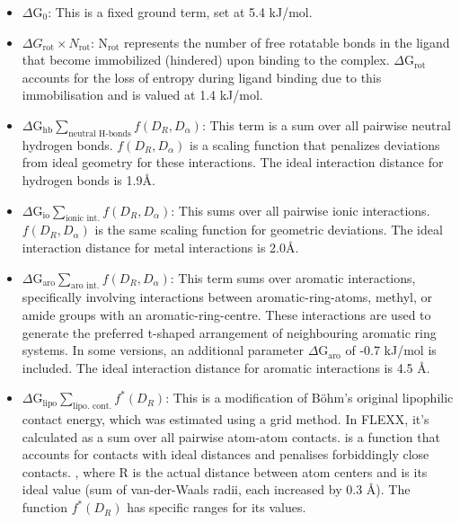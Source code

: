 \documentclass[11pt]{article}
\begin{document}
\begin{itemize}
\item \textbf{$\Delta\text{G}_0$}: This is a fixed ground term, set at 5.4 kJ/mol.

\item \textbf{$\Delta G_{\text{rot}} \times N_{\text{rot}}$}: $\text{N}_{\text{rot}}$ represents the number of free rotatable bonds in the ligand that become immobilized (hindered) upon binding to the complex. $\Delta \text{G}_{\text{rot}}$ accounts for the loss of entropy during ligand binding due to this immobilisation and is valued at 1.4 kJ/mol.

\item \textbf{$\Delta \text{G}_{\text{hb}} \sum_{\text{neutral H-bonds}} f(D_R, D_\alpha)$}: This term is a sum over all pairwise neutral hydrogen bonds. $f(D_R, D_\alpha)$ is a scaling function that penalizes deviations from ideal geometry for these interactions. The ideal interaction distance for hydrogen bonds is 1.9{\AA}.

\item \textbf{$\Delta \text{G}_{\text{io}} \sum_{\text{ionic int.}} f(D_R, D_\alpha)$}: This sums over all pairwise ionic interactions. $f(D_R, D_\alpha)$ is the same scaling function for geometric deviations. The ideal interaction distance for metal interactions is 2.0{\AA}.

\item \textbf{$\Delta \text{G}_{\text{aro}} \sum_{\text{aro int.}} f(D_R, D_\alpha)$}: This term sums over aromatic interactions, specifically involving interactions between aromatic-ring-atoms, methyl, or amide groups with an aromatic-ring-centre. These interactions are used to generate the preferred t-shaped arrangement of neighbouring aromatic ring systems. In some versions, an additional parameter $\Delta \text{G}_{\text{aro}}$ of -0.7 kJ/mol is included. The ideal interaction distance for aromatic interactions is 4.5 {\AA}.

\item \textbf{$\Delta \text{G}_{\text{lipo}} \sum_{\text{lipo. cont.}} f^*(D_R)$}: This is a modification of Böhm’s original lipophilic contact energy, which was estimated using a grid method. In FLEXX, it's calculated as a sum over all pairwise atom-atom contacts.   is a function that accounts for contacts with ideal distances and penalises forbiddingly close contacts. , where R is the actual distance between atom centers and  is its ideal value (sum of van-der-Waals radii, each increased by 0.3 {\AA}). The function $f^*(D_R)$ has specific ranges for its values.

\end{itemize}
\end{document}

